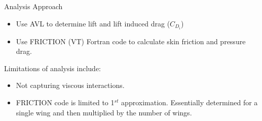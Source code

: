 \begin{frame}{Analysis Approach}

\begin{itemize}
    \item Use AVL to determine lift and lift induced drag ($C_{D_i}$)
    \vspace{5pt}
    \item Use FRICTION (VT) Fortran code to calculate skin friction and pressure drag.
\end{itemize}

\vspace{15pt}
\noindent Limitations of analysis include:

\begin{itemize}
    \item Not capturing viscous interactions.
    \vspace{5pt}
    \item FRICTION code is limited to 1$^{st}$ approximation. Essentially determined for a single wing and then multiplied by the number of wings.
\end{itemize}


\end{frame}
